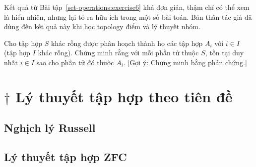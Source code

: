 Kết quả từ Bài tập~\ref{set-operations:exercise6} khá đơn giản, thậm chí có thể xem là hiển nhiên, nhưng lại tỏ ra hữu ích trong một số bài toán. Bản thân tác giả đã dùng đến kết quả này khi học topology điểm và lý thuyết nhóm.

\begin{exercise}\label{set-operations:exercise7}
    Cho tập hợp $S$ khác rỗng được phân hoạch thành họ các tập hợp $A_{i}$ với $i\in I$ (tập hợp $I$ khác rỗng). Chứng minh rằng với mỗi phần tử thuộc $S$, tồn tại duy nhất $i\in I$ sao cho phần tử đó thuộc $A_{i}$. [Gợi ý: Chứng minh bằng phản chứng.]
\end{exercise}


\section{$\dagger$ Lý thuyết tập hợp theo tiên đề}\label{section5:axiomatic-set-theory}

\subsection*{Nghịch lý Russell}

\subsection*{Lý thuyết tập hợp ZFC}
